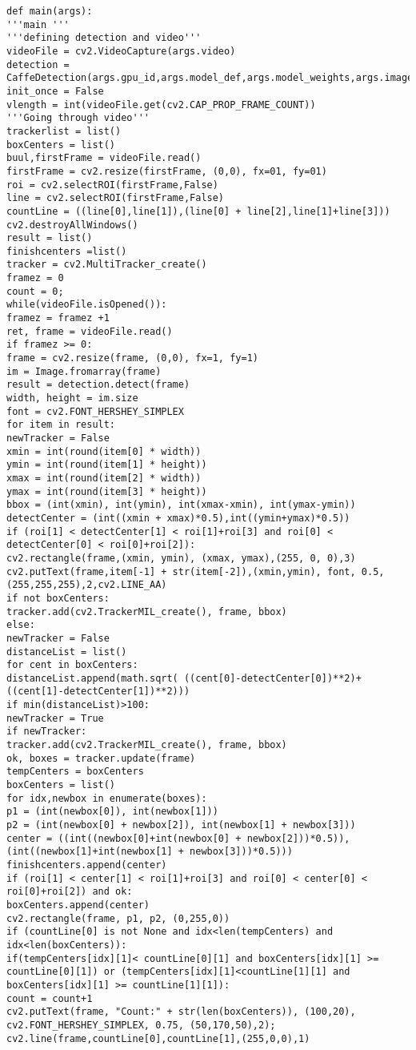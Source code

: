 \documentclass[12pt,paper=a4]{report}
\begin{document}
\begin{lstlisting}[basicstyle=\tiny]
def main(args):
'''main '''
'''defining detection and video'''
videoFile = cv2.VideoCapture(args.video)
detection = CaffeDetection(args.gpu_id,args.model_def,args.model_weights,args.image_resize,args.labelmap_file)
init_once = False
vlength = int(videoFile.get(cv2.CAP_PROP_FRAME_COUNT))    
'''Going through video'''
trackerlist = list()
boxCenters = list()
buul,firstFrame = videoFile.read()
firstFrame = cv2.resize(firstFrame, (0,0), fx=01, fy=01)
roi = cv2.selectROI(firstFrame,False)
line = cv2.selectROI(firstFrame,False)
countLine = ((line[0],line[1]),(line[0] + line[2],line[1]+line[3]))
cv2.destroyAllWindows() 
result = list()
finishcenters =list()
tracker = cv2.MultiTracker_create()  
framez = 0 
count = 0;
while(videoFile.isOpened()):  
framez = framez +1
ret, frame = videoFile.read()
if framez >= 0:
frame = cv2.resize(frame, (0,0), fx=1, fy=1)        
im = Image.fromarray(frame)      
result = detection.detect(frame)        
width, height = im.size
font = cv2.FONT_HERSHEY_SIMPLEX  
for item in result:
newTracker = False              
xmin = int(round(item[0] * width))
ymin = int(round(item[1] * height))
xmax = int(round(item[2] * width))
ymax = int(round(item[3] * height))
bbox = (int(xmin), int(ymin), int(xmax-xmin), int(ymax-ymin))
detectCenter = (int((xmin + xmax)*0.5),int((ymin+ymax)*0.5))   
if (roi[1] < detectCenter[1] < roi[1]+roi[3] and roi[0] < detectCenter[0] < roi[0]+roi[2]):
cv2.rectangle(frame,(xmin, ymin), (xmax, ymax),(255, 0, 0),3)            
cv2.putText(frame,item[-1] + str(item[-2]),(xmin,ymin), font, 0.5,(255,255,255),2,cv2.LINE_AA)                   
if not boxCenters:
tracker.add(cv2.TrackerMIL_create(), frame, bbox)
else:
newTracker = False
distanceList = list()
for cent in boxCenters:
distanceList.append(math.sqrt( ((cent[0]-detectCenter[0])**2)+((cent[1]-detectCenter[1])**2)))
if min(distanceList)>100:
newTracker = True
if newTracker:
tracker.add(cv2.TrackerMIL_create(), frame, bbox)
ok, boxes = tracker.update(frame)
tempCenters = boxCenters
boxCenters = list()
for idx,newbox in enumerate(boxes):            
p1 = (int(newbox[0]), int(newbox[1]))
p2 = (int(newbox[0] + newbox[2]), int(newbox[1] + newbox[3]))
center = ((int((newbox[0]+int(newbox[0] + newbox[2]))*0.5)),(int((newbox[1]+int(newbox[1] + newbox[3]))*0.5)))
finishcenters.append(center)
if (roi[1] < center[1] < roi[1]+roi[3] and roi[0] < center[0] < roi[0]+roi[2]) and ok:
boxCenters.append(center)
cv2.rectangle(frame, p1, p2, (0,255,0))
if (countLine[0] is not None and idx<len(tempCenters) and idx<len(boxCenters)):
if(tempCenters[idx][1]< countLine[0][1] and boxCenters[idx][1] >= countLine[0][1]) or (tempCenters[idx][1]<countLine[1][1] and boxCenters[idx][1] >= countLine[1][1]):
count = count+1
cv2.putText(frame, "Count:" + str(len(boxCenters)), (100,20), cv2.FONT_HERSHEY_SIMPLEX, 0.75, (50,170,50),2); 
cv2.line(frame,countLine[0],countLine[1],(255,0,0),1)


\end{lstlisting}
\end{document}
